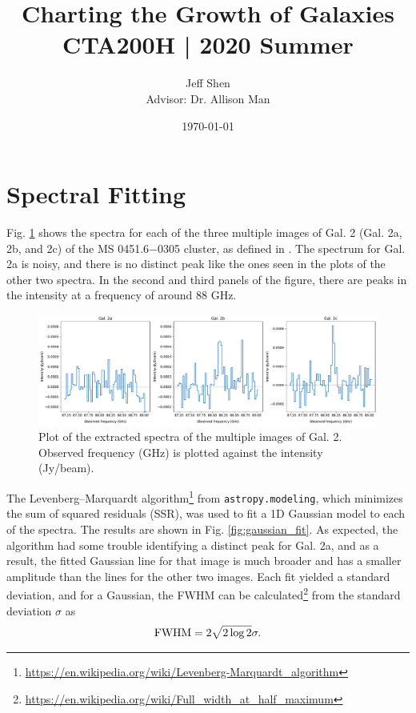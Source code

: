 \documentclass[11pt]{article}
\newcommand{\code}{\texttt}
\begin{document}
\title{\textbf{Charting the Growth of Galaxies} \\[0.25cm] \large{CTA200H | 2020 Summer}}
\author{Jeff Shen \\ Advisor: Dr. Allison Man}
\date{\today}
\maketitle

\section*{Spectral Fitting}

Fig. \ref{fig:initial_spectra} shows the spectra for each of the three multiple images of Gal. 2 (Gal. 2a, 2b, and 2c) of the MS 0451.6−0305 cluster, as defined in \cite{MacKenzie2014}. The spectrum for Gal. 2a is noisy, and there is no distinct peak like the ones seen in the plots of the other two spectra. In the second and third panels of the figure, there are peaks in the intensity at a frequency of around 88 GHz. 

\begin{figure}[!htbp]
    \centering
    \includegraphics[width=\linewidth]{../figs/initial_spectra.pdf}
	\caption{Plot of the extracted spectra of the multiple images of Gal. 2. Observed frequency (GHz) is plotted against the intensity (Jy/beam).}
    \label{fig:initial_spectra}
\end{figure}

The Levenberg–Marquardt algorithm\footnote{\url{https://en.wikipedia.org/wiki/Levenberg-Marquardt_algorithm}} from \code{astropy.modeling}, which minimizes the sum of squared residuals (SSR), was used to fit a 1D Gaussian model to each of the spectra. The results are shown in Fig. \ref{fig:gaussian_fit}. As expected, the algorithm had some trouble identifying a distinct peak for Gal. 2a, and as a result, the fitted Gaussian line for that image is much broader and has a smaller amplitude than the lines for the other two images. Each fit yielded a standard deviation, and for a Gaussian, the FWHM can be calculated\footnote{\url{https://en.wikipedia.org/wiki/Full_width_at_half_maximum}} from the standard deviation $\sigma$ as 
\begin{align}\label{eqn:fwhm}
	\rm{FWHM} = 2\sqrt{2\log{2}}\sigma.
\end{align}
\end{document}
